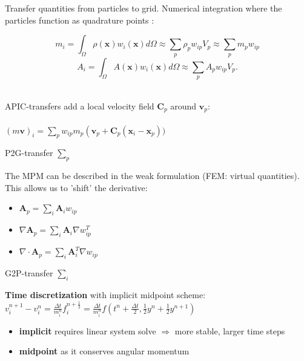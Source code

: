 \documentclass{beamer}
\let\oldcite=\cite
\renewcommand{\cite}[1]{\textcolor[rgb]{.55,.55,.89}{\oldcite{#1}}}
\begin{document}
\begin{frame}
Transfer quantities from particles to grid. Numerical integration where the particles function as quadrature points \cite{Steffen}:

$$m_i = \int_\Omega \rho(\boldsymbol{x})w_i(\boldsymbol{x}) d\Omega \approx \sum_p \rho_p w_{ip} V_p \approx \sum_p m_p w_{ip}$$
$$A _ { i } = \int _ { \Omega }  A ( \boldsymbol{x} ) w _ { i } ( \boldsymbol{x} ) d \Omega \approx \sum _ { p } A _ { p }  w_{ip} V _ { p }.$$ \\
\begin{minipage}{0.62\textwidth}
APIC-transfers add a local velocity field $\boldsymbol{C}_p$ around $\boldsymbol{v}_p$:
\\\vspace*{-10}\\
$ ( m \boldsymbol{v} ) _ { i } = \sum _ { p } w _ { i p } m _ { p } \left( \boldsymbol{v} _ { p } + \boldsymbol{C} _ { p } ( \boldsymbol{x} _ { i } - \boldsymbol{x} _ { p } ))$
\end{minipage}
\begin{minipage}{0.33\textwidth}
\begin{minipage}{1.0\textwidth}
  \small
  
  P2G-transfer $\sum_p$
\\
\end{minipage}

\end{minipage}
\end{frame}

\begin{frame}
\begin{minipage}{0.64\textwidth}
The MPM can be described in the weak formulation (FEM: virtual quantities). This allows us to 'shift' the derivative:\begin{itemize}
\item $\boldsymbol{A}_p = \sum_i \boldsymbol{A}_i w_{ip} $
\item $\nabla \boldsymbol{A}_p = \sum_i \boldsymbol{A}_i \nabla w_{ip}^T $
\item$\nabla \cdot \boldsymbol{A}_p = \sum_i \boldsymbol{A}^T_i \nabla w_{ip} $
\end{itemize}
\end{minipage}
\begin{minipage}{0.30\textwidth}
\begin{minipage}{1.0\textwidth}
  \small
  
  G2P-transfer $\sum_i$
\end{minipage}
\end{minipage}
\vfill
\textbf{Time discretization} with implicit midpoint scheme:\\
$v_i ^ { n + 1 } - v_i ^ { n } = \frac{\Delta t}{m_i^n}f_i ^ { n + \frac{1}{2} } =\frac{\Delta t}{m_i^n} f \left( t ^ { n } + \frac{\Delta t}{2}, \frac{1}{2} y ^ { n } + \frac{1}{2} y ^ { n + 1 } \right)$
\begin{itemize}
  \item \textbf{implicit} requires linear system solve $\Rightarrow$ more stable, larger time steps
  \item \textbf{midpoint} as it conserves angular momentum
\end{itemize}
\end{frame}
\end{document}
